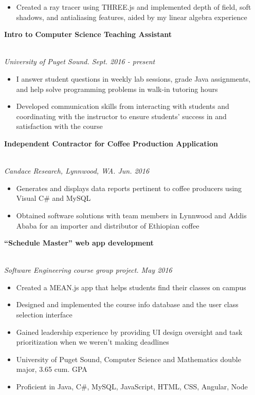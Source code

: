 \documentclass[11pt]{article}
\newcommand\phv{\fontfamily{phv}\selectfont}
\begin{document}
\begin{itemize}
	\item Created a ray tracer using THREE.js and implemented depth of field, soft shadows, and antialiasing features, aided by my linear algebra experience
\end{itemize}
\noindent \centerline{\large \bf Intro to Computer Science Teaching Assistant \hfill }
\\\emph{University of Puget Sound. Sept. 2016 - present}
\begin{itemize}
  \item I answer student questions in weekly lab sessions, grade Java assignments, and help solve programming problems in walk-in tutoring hours
  \item Developed communication skills from interacting with students and coordinating with the instructor to ensure students' success in and satisfaction with the course
\end{itemize}
\noindent \centerline{\large \bf Independent Contractor for Coffee Production Application \hfill }
\\\emph{Candace Research, Lynnwood, WA. Jun. 2016}
\begin{itemize}
  \item Generates and displays data reports pertinent to coffee producers using Visual C\# and MySQL
  \item Obtained software solutions with team members in Lynnwood and Addis Ababa for an importer and distributor of Ethiopian coffee
\end{itemize}
\noindent \centerline{\large \bf ``Schedule Master'' web app development \hfill }
\\\emph{Software Engineering course group project. May 2016}
\begin{itemize}
  \item Created a MEAN.js app that helps students find their classes on campus
  \item Designed and implemented the course info database and the user class selection interface
  \item Gained leadership experience by providing UI design oversight and task prioritization when we weren't making deadlines
\end{itemize}
\noindent{\LARGE \bf \phv{Education \& Technology}  }
\begin{itemize}
  \item University of Puget Sound, Computer Science and Mathematics double major, 3.65 cum. GPA
  \item Proficient in Java, C\#, MySQL, JavaScript, HTML, CSS, Angular, Node
\end{itemize}
\end{document}
